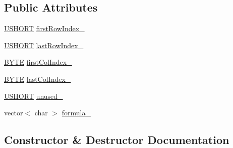 \subsection*{Public Attributes}
\begin{DoxyCompactItemize}
\item 
\hyperlink{_basic_excel_8hpp_a5850d5316caf7f4cedd742fdf8cd7c02}{U\+S\+H\+O\+R\+T} \hyperlink{struct_y_excel_1_1_worksheet_1_1_cell_table_1_1_row_block_1_1_cell_block_1_1_formula_1_1_shr_fmla1_adf913e0c7ee95f7f941045440961bed2}{first\+Row\+Index\+\_\+}
\item 
\hyperlink{_basic_excel_8hpp_a5850d5316caf7f4cedd742fdf8cd7c02}{U\+S\+H\+O\+R\+T} \hyperlink{struct_y_excel_1_1_worksheet_1_1_cell_table_1_1_row_block_1_1_cell_block_1_1_formula_1_1_shr_fmla1_aee6d075d4dbf0e2391ed6e1c5c9969d3}{last\+Row\+Index\+\_\+}
\item 
\hyperlink{_basic_excel_8hpp_a4ae1dab0fb4b072a66584546209e7d58}{B\+Y\+T\+E} \hyperlink{struct_y_excel_1_1_worksheet_1_1_cell_table_1_1_row_block_1_1_cell_block_1_1_formula_1_1_shr_fmla1_a6fc8c6f021fa1c546e6f2ed122a3c7b9}{first\+Col\+Index\+\_\+}
\item 
\hyperlink{_basic_excel_8hpp_a4ae1dab0fb4b072a66584546209e7d58}{B\+Y\+T\+E} \hyperlink{struct_y_excel_1_1_worksheet_1_1_cell_table_1_1_row_block_1_1_cell_block_1_1_formula_1_1_shr_fmla1_a7079478581997ca191dc578b1f50a9c4}{last\+Col\+Index\+\_\+}
\item 
\hyperlink{_basic_excel_8hpp_a5850d5316caf7f4cedd742fdf8cd7c02}{U\+S\+H\+O\+R\+T} \hyperlink{struct_y_excel_1_1_worksheet_1_1_cell_table_1_1_row_block_1_1_cell_block_1_1_formula_1_1_shr_fmla1_a359690527bc570ccb94c526abff9bcc6}{unused\+\_\+}
\item 
vector$<$ char $>$ \hyperlink{struct_y_excel_1_1_worksheet_1_1_cell_table_1_1_row_block_1_1_cell_block_1_1_formula_1_1_shr_fmla1_a3e9a241488ed01c80923799244ddbc91}{formula\+\_\+}
\end{DoxyCompactItemize}


\subsection{Constructor \& Destructor Documentation}
\hypertarget{struct_y_excel_1_1_worksheet_1_1_cell_table_1_1_row_block_1_1_cell_block_1_1_formula_1_1_shr_fmla1_a520ab6793482389e85dfb5694743bd3a}{}
